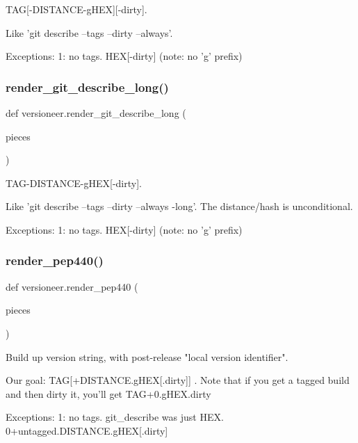 \begin{DoxyVerb}TAG[-DISTANCE-gHEX][-dirty].

Like 'git describe --tags --dirty --always'.

Exceptions:
1: no tags. HEX[-dirty]  (note: no 'g' prefix)
\end{DoxyVerb}
 \mbox{\label{namespaceversioneer_a344d827c720edf120ec69b42d052263a}} 
\subsubsection{\texorpdfstring{render\+\_\+git\+\_\+describe\+\_\+long()}{render\_git\_describe\_long()}}
{\footnotesize\ttfamily def versioneer.\+render\+\_\+git\+\_\+describe\+\_\+long (\begin{DoxyParamCaption}\item[{}]{pieces }\end{DoxyParamCaption})}

\begin{DoxyVerb}TAG-DISTANCE-gHEX[-dirty].

Like 'git describe --tags --dirty --always -long'.
The distance/hash is unconditional.

Exceptions:
1: no tags. HEX[-dirty]  (note: no 'g' prefix)
\end{DoxyVerb}
 \mbox{\label{namespaceversioneer_ab8f2f6a39b1c282abdee3f449ed023a9}} 
\subsubsection{\texorpdfstring{render\+\_\+pep440()}{render\_pep440()}}
{\footnotesize\ttfamily def versioneer.\+render\+\_\+pep440 (\begin{DoxyParamCaption}\item[{}]{pieces }\end{DoxyParamCaption})}

\begin{DoxyVerb}Build up version string, with post-release "local version identifier".

Our goal: TAG[+DISTANCE.gHEX[.dirty]] . Note that if you
get a tagged build and then dirty it, you'll get TAG+0.gHEX.dirty

Exceptions:
1: no tags. git_describe was just HEX. 0+untagged.DISTANCE.gHEX[.dirty]
\end{DoxyVerb}
 \mbox{\label{namespaceversioneer_a3e920b961ce90f0fc3f49cccaebc9918}} 
